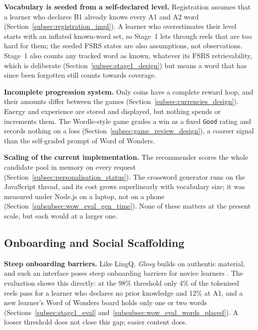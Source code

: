     \textbf{Vocabulary is seeded from a self-declared level.} Registration assumes that a learner who declares B1 already knows every A1 and A2 word (Section~\ref{subsec:registration_impl}). A learner who overestimates their level starts with an inflated known-word set, so Stage~1 lets through reels that are too hard for them; the seeded FSRS states are also assumptions, not observations. Stage~1 also counts any tracked word as known, whatever its FSRS retrievability, which is deliberate (Section~\ref{subsec:stage1_design}) but means a word that has since been forgotten still counts towards coverage.

    \textbf{Incomplete progression system.} Only coins have a complete reward loop, and their amounts differ between the games (Section~\ref{subsec:currencies_design}). Energy and experience are stored and displayed, but nothing spends or increments them. The Wordle-style game grades a win as a fixed \texttt{Good} rating and records nothing on a loss (Section~\ref{subsec:game_review_design}), a coarser signal than the self-graded prompt of Word of Wonders.

    \textbf{Scaling of the current implementation.} The recommender scores the whole candidate pool in memory on every request (Section~\ref{subsec:personalisation_status}). The crossword generator runs on the JavaScript thread, and its cost grows superlinearly with vocabulary size; it was measured under Node.js on a laptop, not on a phone (Section~\ref{subsubsec:wow_eval_gen_time}). None of these matters at the present scale, but each would at a larger one.

    \subsection{Onboarding and Social Scaffolding}
    \textbf{Steep onboarding barriers.} Like LingQ, \textit{Glosy} builds on authentic material, and such an interface poses steep onboarding barriers for novice learners \cite{karasimos2022battle}. The evaluation shows this directly: at the 98\% threshold only 4\% of the tokenised reels pass for a learner who declares no prior knowledge and 12\% at A1, and a new learner's Word of Wonders board holds only one or two words (Sections~\ref{subsec:stage1_eval} and~\ref{subsubsec:wow_eval_words_placed}). A looser threshold does not close this gap; easier content does.

